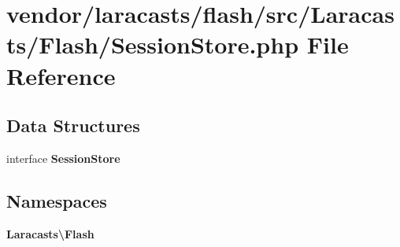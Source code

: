 \section{vendor/laracasts/flash/src/\+Laracasts/\+Flash/\+Session\+Store.php File Reference}
\label{_session_store_8php}
\subsection*{Data Structures}
\begin{DoxyCompactItemize}
\item 
interface {\bf Session\+Store}
\end{DoxyCompactItemize}
\subsection*{Namespaces}
\begin{DoxyCompactItemize}
\item 
 {\bf Laracasts\textbackslash{}\+Flash}
\end{DoxyCompactItemize}
